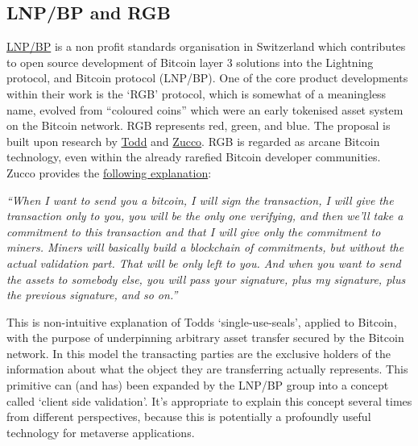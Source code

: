 \subsection{LNP/BP and RGB}
\href{https://giacomozucco.com/layers-before-bitcoin}{LNP/BP} is a non profit standards organisation in Switzerland which contributes to open source development of Bitcoin layer 3 solutions into the Lightning protocol, and Bitcoin protocol (LNP/BP). One of the core product developments within their work is the `RGB' protocol, which is somewhat of a meaningless name, evolved from ``coloured coins'' which were an early tokenised asset system on the Bitcoin network. RGB represents red, green, and blue. The proposal is built upon research by \href{https://petertodd.org/2016/commitments-and-single-use-seals}{Todd} and \href{https://giacomozucco.com/#intro}{Zucco}. RGB is regarded as arcane Bitcoin technology, even within the already rarefied Bitcoin developer communities. Zucco provides the \href{https://bitcoinmagazine.com/culture/video-interview-giacomo-zucco-rgb-tokens-built-bitcoin}{following explanation}: \par
\textit{``When I want to send you a bitcoin, I will sign the transaction, I will give the transaction only to you, you will be the only one verifying, and then we’ll take a commitment to this transaction and that I will give only the commitment to miners. Miners will basically build a blockchain of commitments, but without the actual validation part. That will be only left to you. And when you want to send the assets to somebody else, you will pass your signature, plus my signature, plus the previous signature, and so on.''}\par
This is non-intuitive explanation of Todds `single-use-seals', applied to Bitcoin, with the purpose of underpinning arbitrary asset transfer secured by the Bitcoin network. In this model the transacting parties are the exclusive holders of the information about what the object they are transferring actually represents. This primitive can (and has) been expanded by the LNP/BP group into a concept called `client side validation'. 
It's appropriate to explain this concept several times from different perspectives, because this is potentially a profoundly useful technology for metaverse applications.\par
